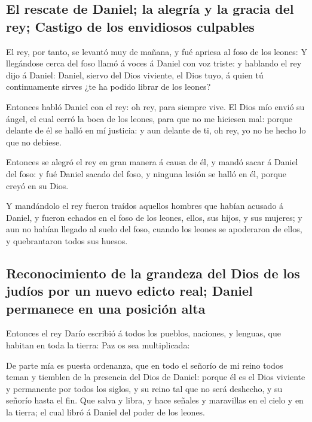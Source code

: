 \hypertarget{el-rescate-de-daniel-la-alegruxeda-y-la-gracia-del-rey-castigo-de-los-envidiosos-culpables}{%
\subsection{El rescate de Daniel; la alegría y la gracia del rey;
Castigo de los envidiosos
culpables}\label{el-rescate-de-daniel-la-alegruxeda-y-la-gracia-del-rey-castigo-de-los-envidiosos-culpables}}

 El rey, por tanto, se levantó muy de mañana, y fué apriesa
al foso de los leones:  Y llegándose cerca del foso llamó á
voces á Daniel con voz triste: y hablando el rey dijo á Daniel: Daniel,
siervo del Dios viviente, el Dios tuyo, á quien tú continuamente sirves
¿te ha podido librar de los leones?

 Entonces habló Daniel con el rey: oh rey, para siempre
vive.  El Dios mío envió su ángel, el cual cerró la boca de
los leones, para que no me hiciesen mal: porque delante de él se halló
en mí justicia: y aun delante de ti, oh rey, yo no he hecho lo que no
debiese.

 Entonces se alegró el rey en gran manera á causa de él, y
mandó sacar á Daniel del foso: y fué Daniel sacado del foso, y ninguna
lesión se halló en él, porque creyó en su Dios.

 Y mandándolo el rey fueron traídos aquellos hombres que
habían acusado á Daniel, y fueron echados en el foso de los leones,
ellos, sus hijos, y sus mujeres; y aun no habían llegado al suelo del
foso, cuando los leones se apoderaron de ellos, y quebrantaron todos sus
huesos.

\hypertarget{reconocimiento-de-la-grandeza-del-dios-de-los-juduxedos-por-un-nuevo-edicto-real-daniel-permanece-en-una-posiciuxf3n-alta}{%
\subsection{Reconocimiento de la grandeza del Dios de los judíos por un
nuevo edicto real; Daniel permanece en una posición
alta}\label{reconocimiento-de-la-grandeza-del-dios-de-los-juduxedos-por-un-nuevo-edicto-real-daniel-permanece-en-una-posiciuxf3n-alta}}

 Entonces el rey Darío escribió á todos los pueblos,
naciones, y lenguas, que habitan en toda la tierra: Paz os sea
multiplicada:

 De parte mía es puesta ordenanza, que en todo el señorío
de mi reino todos teman y tiemblen de la presencia del Dios de Daniel:
porque él es el Dios viviente y permanente por todos los siglos, y su
reino tal que no será deshecho, y su señorío hasta el fin. 
Que salva y libra, y hace señales y maravillas en el cielo y en la
tierra; el cual libró á Daniel del poder de los leones.

